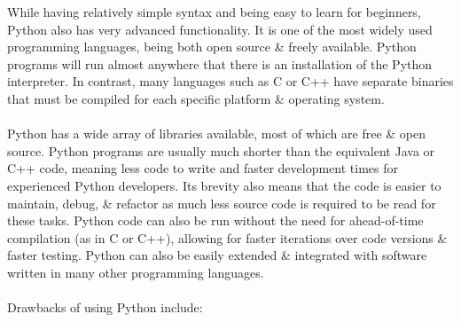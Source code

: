 \documentclass[a4paper,11pt]{article}
\begin{document}
While having relatively simple syntax and being easy to learn for beginners, Python also has very advanced 
functionality.
It is one of the most widely used programming languages, being both open source \& freely available.
Python programs will run almost anywhere that there is an installation of the Python interpreter.
In contrast, many languages such as C or C++ have separate binaries that must be compiled for each specific platform
\& operating system.
\\\\
Python has a wide array of libraries available, most of which are free \& open source.
Python programs are usually much shorter than the equivalent Java or C++ code, meaning less code to write and 
faster development times for experienced Python developers.
Its brevity also means that the code is easier to maintain, debug, \& refactor as much less source code is required 
to be read for these tasks.
Python code can also be run without the need for ahead-of-time compilation (as in C or C++), allowing for faster
iterations over code versions \& faster testing.
Python can also be easily extended \& integrated with software written in many other programming languages.
\\\\
Drawbacks of using Python include:
\end{document}
